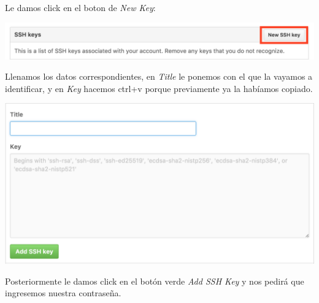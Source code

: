 \documentclass{article}
\begin{document}
\begin{itemize}
\begin{enumerate}
      Le damos click en el boton de \textit{New Key}:
      \begin{center}
        \includegraphics[scale=0.3]{4}
      \end{center}

      Llenamos los datos correspondientes, en \textit{Title} le ponemos con el que la vayamos a identificar, y en \textit{Key} hacemos ctrl+v porque previamente ya la habíamos copiado.
      \begin{center}
        \includegraphics[scale=0.4]{5}
      \end{center}

      Posteriormente le damos click en el botón verde \textit{Add SSH Key} y nos pedirá que ingresemos nuestra contraseña.

    \end{enumerate}


\end{itemize}
\end{document}
